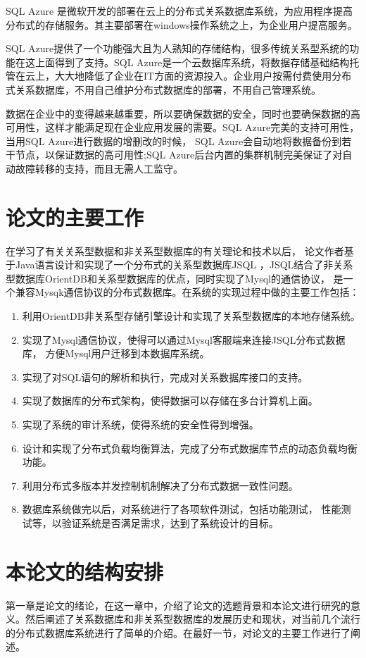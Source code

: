 	
	SQL Azure 是微软开发的部署在云上的分布式关系数据库系统，为应用程序提高分布式的存储服务。其主要部署在windows操作系统之上，为企业用户提高服务。
	
	SQL Azure提供了一个功能强大且为人熟知的存储结构，很多传统关系型系统的功能在这上面得到了支持。SQL Azure是一个云数据库系统，将数据存储基础结构托管在云上，大大地降低了企业在IT方面的资源投入。企业用户按需付费使用分布式关系数据库，不用自己维护分布式数据库的部署，不用自己管理系统。
	
	数据在企业中的变得越来越重要，所以要确保数据的安全，同时也要确保数据的高可用性，这样才能满足现在企业应用发展的需要。SQL Azure完美的支持可用性，当用SQL Azure进行数据的增删改的时候， SQL Azure会自动地将数据备份到若干节点，以保证数据的高可用性;SQL Azure后台内置的集群机制完美保证了对自动故障转移的支持，而且无需人工监守。
\section{论文的主要工作}
在学习了有关关系型数据和非关系型数据库的有关理论和技术以后，
论文作者基于Java语言设计和实现了一个分布式的关系型数据库JSQL
，JSQL结合了非关系型数据库OrientDB和关系型数据库的优点，同时实现了Mysql的通信协议，
是一个兼容Mysqk通信协议的分布式数据库。在系统的实现过程中做的主要工作包括：
\begin{enumerate}[fullwidth,itemindent=2em]
	\item 利用OrientDB非关系型存储引擎设计和实现了关系型数据库的本地存储系统。
	\item 实现了Mysql通信协议，使得可以通过Mysql客服端来连接JSQL分布式数据库，
	方便Mysql用户迁移到本数据库系统。
	\item 实现了对SQL语句的解析和执行，完成对关系数据库接口的支持。
	\item 实现了数据库的分布式架构，使得数据可以存储在多台计算机上面。
	\item 实现了系统的审计系统，使得系统的安全性得到增强。
	\item 设计和实现了分布式负载均衡算法，完成了分布式数据库节点的动态负载均衡功能。
	\item 利用分布式多版本并发控制机制解决了分布式数据一致性问题。
	\item 数据库系统做完以后，对系统进行了各项软件测试，包括功能测试，
	性能测试等，以验证系统是否满足需求，达到了系统设计的目标。
\end{enumerate}
\section{本论文的结构安排}
第一章是论文的绪论，在这一章中，介绍了论文的选题背景和本论文进行研究的意
义。然后阐述了关系数据库和非关系型数据库的发展历史和现状，对当前几个流行的分布式数据库系统进行了简单的介绍。在最好一节，对论文的主要工作进行了阐述。

